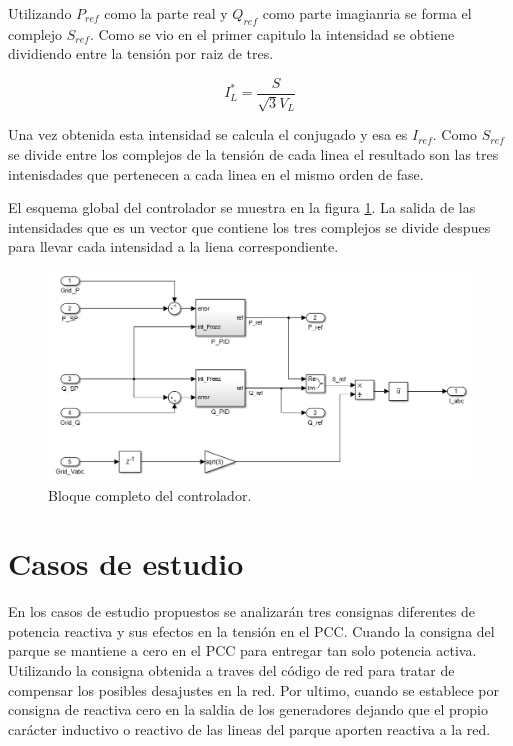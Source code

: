 \documentclass{book}
\begin{document}
Utilizando $P_{ref}$  como la parte real y $Q_{ref}$ como parte imagianria se forma el complejo $S_{ref}$. Como se vio en el primer capitulo la intensidad se obtiene dividiendo entre la tensi\'on por raiz de tres. 

\begin{equation}
	I_L^*= \frac{S}{\sqrt{3}V_L}
\end{equation}

Una vez obtenida esta intensidad se calcula el conjugado y esa es $I_{ref}$. Como $S_{ref}$ se divide entre los complejos de la tensi\'on de cada linea el resultado son las tres intenisdades que pertenecen a cada linea en el mismo orden de fase. \par

El esquema global del controlador se muestra en la figura \ref{PPC}. La salida de las intensidades que es un vector que contiene los tres complejos se divide despues para llevar cada intensidad a la liena correspondiente. \par

\begin{figure}[h!]
\centering
\includegraphics[width=1\textwidth]{PPC.PNG}
\caption{Bloque completo del controlador. }
\label{PPC}
\end{figure} \par

	\section{Casos de estudio}

En los casos de estudio propuestos se analizar\'an tres consignas diferentes de potencia reactiva y sus efectos en la tensi\'on en el PCC. Cuando la consigna del parque se mantiene a cero en el PCC para entregar tan solo potencia activa. Utilizando la consigna obtenida a traves del c\'odigo de red para tratar de compensar los posibles desajustes en la red. Por ultimo, cuando se establece por consigna de reactiva cero en la saldia de los generadores dejando que el propio car\'acter inductivo o reactivo de las lineas del parque aporten reactiva a la red. \par
\end{document}
